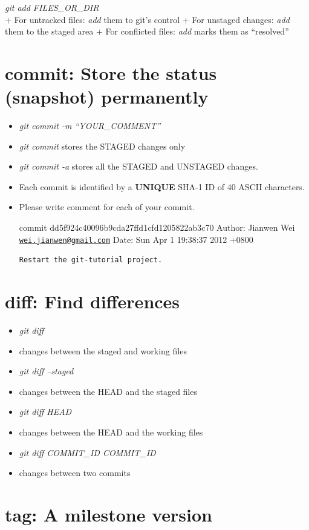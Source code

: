 \documentclass[]{article}
\begin{document}
\emph{git add FILES\_OR\_DIR}\\ + For untracked files: \emph{add} them
to git's control + For unstaged changes: \emph{add} them to the staged
area + For conflicted files: \emph{add} marks them as ``resolved''

\section{commit: Store the status (snapshot) permanently}

\begin{itemize}
\item
  \emph{git commit -m ``YOUR\_COMMENT''}
\item
  \emph{git commit} stores the STAGED changes only
\item
  \emph{git commit -a} stores all the STAGED and UNSTAGED changes.
\item
  Each commit is identified by a \textbf{UNIQUE} SHA-1 ID of 40 ASCII
  characters.
\item
  Please write comment for each of your commit.

  commit dd5f924c40096b9cda27ffd1cfd1205822ab3c70 Author: Jianwen Wei
  \href{mailto:wei.jianwen@gmail.com}{\texttt{wei.jianwen@gmail.com}}
  Date: Sun Apr 1 19:38:37 2012 +0800

\begin{verbatim}
Restart the git-tutorial project.
\end{verbatim}
\end{itemize}
\section{diff: Find differences}

\begin{itemize}
\item
  \emph{git diff}
\item
  changes between the staged and working files
\item
  \emph{git diff --staged}
\item
  changes between the HEAD and the staged files
\item
  \emph{git diff HEAD}
\item
  changes between the HEAD and the working files
\item
  \emph{git diff COMMIT\_ID COMMIT\_ID}
\item
  changes between two commits
\end{itemize}
\section{tag: A milestone version}
\end{document}

